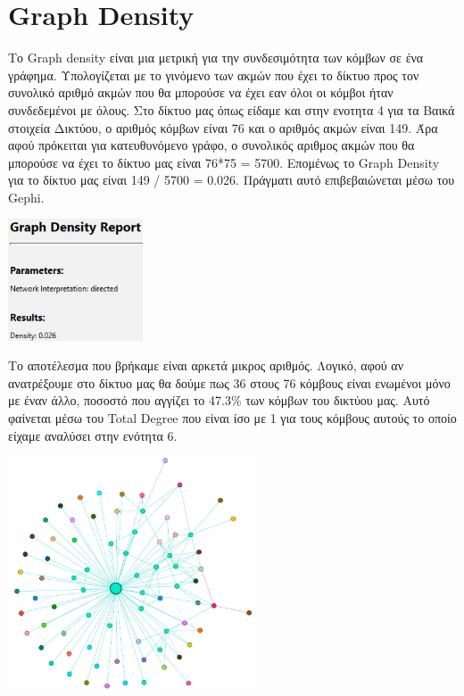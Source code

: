\documentclass[12pt]{article}
\begin{document}
	\section{Graph Density}
	Το Graph density είναι μια μετρική για την συνδεσιμότητα των κόμβων σε ένα γράφημα. Υπολογίζεται με το γινόμενο των ακμών που έχει το δίκτυο προς τον συνολικό αριθμό ακμών που θα μπορούσε να έχει εαν όλοι οι κόμβοι ήταν συνδεδεμένοι με όλους. Στο δίκτυο μας όπως είδαμε και στην ενοτητα 4 για τα Βαικά στοιχεία Δικτύου, ο αριθμός κόμβων είναι 76 και ο αριθμός ακμών είναι 149. Άρα αφού πρόκειται για κατευθυνόμενο γράφο, ο συνολικός αριθμος ακμών που θα μπορούσε να έχει το δίκτυο μας είναι 76*75 = 5700. Επομένως το Graph Density για το δίκτυο μας είναι 149 / 5700 = 0.026. Πράγματι αυτό επιβεβαιώνεται μέσω του Gephi.
	\begin{center}
		\includegraphics[width=0.3\textwidth]{photos-files/section11/density.JPG}
	\end{center}Το αποτέλεσμα που βρήκαμε είναι αρκετά μικρος αριθμός. Λογικό, αφού αν ανατρέξουμε στο δίκτυο μας θα δούμε πως 36 στους 76 κόμβους είναι ενωμένοι μόνο με έναν άλλο, ποσοστό που αγγίζει το 47.3\% των κόμβων του δικτύου μας. Αυτό φαίνεται μέσω του Total Degree που είναι ίσο με 1 για τους κόμβους αυτούς το οποίο είχαμε αναλύσει στην ενότητα 6.
	\begin{center}
		\includegraphics[width=0.55\textwidth]{photos-files/section11/our_sparse_graph.JPG}
	\end{center}
	\label{chap:graph_density_11}
	
\end{document}
